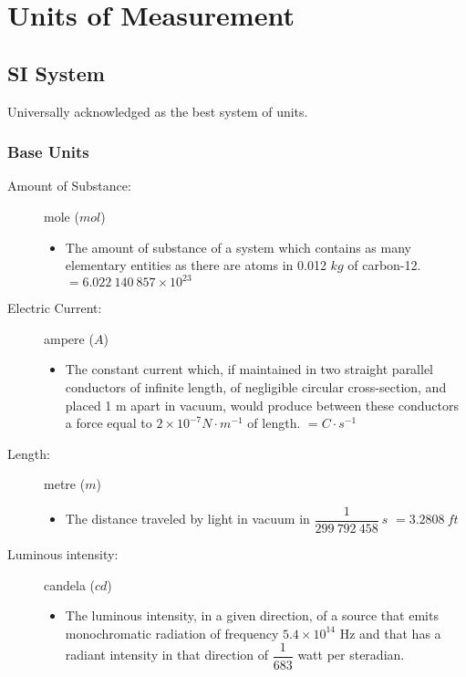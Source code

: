 \chapter{Units of Measurement}
            
            
\section{SI System}	
Universally acknowledged as the best system of units.

\subsection{Base Units}
\begin{description}

\item[Amount of Substance:] mole ($mol$)
\begin{itemize}
\item The amount of substance of a system which contains as many elementary entities as there are atoms in 0.012 $kg$ of carbon-12.
\items $= 6.022\ 140\ 857 \times 10^{23}$
\end{itemize}			

\item[Electric Current:] ampere ($A$)
\begin{itemize}
\item The constant current which, if maintained in two straight parallel conductors of infinite length, of negligible circular cross-section, and placed 1 m apart in vacuum, would produce between these conductors a force equal to $2×10^{-7} N\cdot m^{-1}$ of length.
\items $= C\cdot s^{-1} $
\end{itemize}			

\item[Length:] metre ($m$)
\begin{itemize}
\item The distance traveled by light in vacuum in $\dfrac{1}{299\ 792\ 458}\ s$
\items $=3.2808\ ft$
\end{itemize}

\item[Luminous intensity:] candela ($cd$)
\begin{itemize}
\item The luminous intensity, in a given direction, of a source that emits monochromatic radiation of frequency $5.4 \times 10^{14}$ Hz and that has a radiant intensity in that direction of $\dfrac{1}{683}$ watt per steradian.
\end{itemize}


\end{description}
